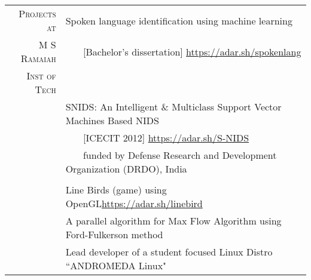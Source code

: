 \documentclass[a4paper,10pt]{article} %
\begin{document}
\begin{tabular}{rp{12cm}}
	\textsc{Projects at} & Spoken language identification using machine learning \\ 
	\textsc{M S Ramaiah} & ~~~ [Bachelor's dissertation] \qquad \qquad \href{https://adar.sh/spokenlang}{https://adar.sh/spokenlang} \\
	\textsc{Inst of Tech} & \\
	& SNIDS: An Intelligent \& Multiclass Support Vector Machines Based NIDS \\ 
	& ~~~ [ICECIT 2012] \qquad \qquad \qquad \qquad \quad \href{https://adar.sh/S-NIDS}{https://adar.sh/S-NIDS} \\
	& ~~~ funded by Defense Research and Development Organization (DRDO), India \\
	& \\
	& Line Birds (game) using OpenGL\qquad \href{https://adar.sh/linebird}{https://adar.sh/linebird}\\
	& A parallel algorithm for Max Flow Algorithm using Ford-Fulkerson method \\
	& Lead developer of a student focused Linux Distro ``ANDROMEDA Linux" \\
\end{tabular}

\iffalse
\end{document}
